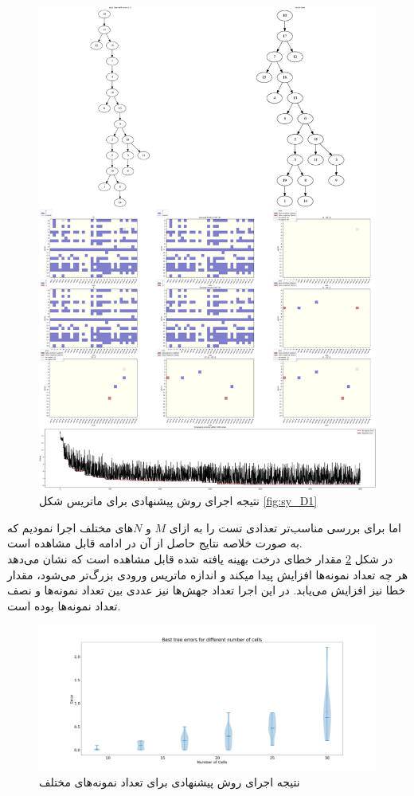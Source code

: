 \newpage
\begin{figure}[!ht]
	\centering
	\includegraphics[height=0.9\textheight]{img/res/benchmark1}
	\caption{‌نتیجه اجرای روش پیشنهادی برای ماتریس شکل \ref*{fig:sy_D1}}
	\label{fig:sy_benchmark1}
\end{figure}
\pagebreak
اما برای بررسی مناسب‌تر تعدادی تست را به ازای $M$ و $N$های مختلف اجرا نمودیم که به صورت خلاصه نتایج حاصل از آن در ادامه قابل مشاهده است.
\\
در شکل \ref{fig:sy_n_err} مقدار خطای درخت بهینه یافته شده قابل مشاهده است که نشان می‌دهد هر چه تعداد نمونه‌ها افزایش پیدا میکند و اندازه ماتریس ورودی بزرگ‌تر می‌شود، مقدار خطا نیز افزایش می‌یابد. در این اجرا تعداد جهش‌ها نیز عددی بین تعداد نمونه‌ها و نصف تعداد نمونه‌ها بوده است.
\begin{figure}[!ht]
	\centering
	\includegraphics[width=\textwidth]{img/res/sy_N_Err}
	\caption{‌نتیجه اجرای روش پیشنهادی برای تعداد نمونه‌های مختلف}
	\label{fig:sy_n_err}
\end{figure}
